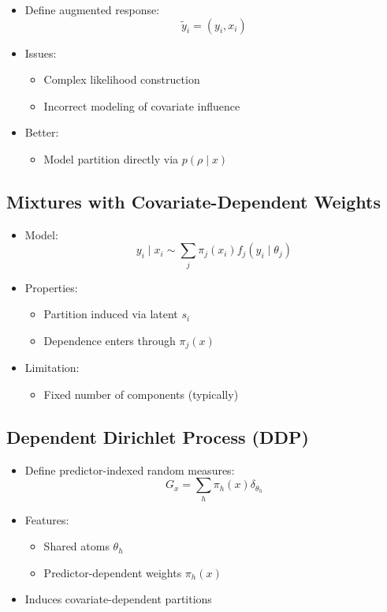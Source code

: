 \documentclass[12pt,oneside]{book}
\numberwithin{equation}{section}
\theoremstyle{definition}
\theoremstyle{plain}
\theoremstyle{remark}
\begin{document}
\begin{itemize}
\item Define augmented response:
\[
\tilde{y}_i = (y_i, x_i)
\]

\item Issues:
\begin{itemize}
\item Complex likelihood construction
\item Incorrect modeling of covariate influence
\end{itemize}

\item Better:
\begin{itemize}
\item Model partition directly via $p(\rho \mid x)$
\end{itemize}
\end{itemize}

\subsection*{Mixtures with Covariate-Dependent Weights}

\begin{itemize}
\item Model:
\[
y_i \mid x_i \sim \sum_{j} \pi_j(x_i) f_j(y_i \mid \theta_j)
\]

\item Properties:
\begin{itemize}
\item Partition induced via latent $s_i$
\item Dependence enters through $\pi_j(x)$
\end{itemize}

\item Limitation:
\begin{itemize}
\item Fixed number of components (typically)
\end{itemize}
\end{itemize}

\subsection*{Dependent Dirichlet Process (DDP)}

\begin{itemize}
\item Define predictor-indexed random measures:
\[
G_x = \sum_h \pi_h(x)\delta_{\theta_h}
\]

\item Features:
\begin{itemize}
\item Shared atoms $\theta_h$
\item Predictor-dependent weights $\pi_h(x)$
\end{itemize}

\item Induces covariate-dependent partitions
\end{itemize}
\end{document}
